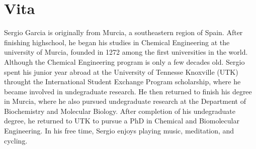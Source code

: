\chapter*{Vita} \label{ch:vita}
Sergio Garcia is originally from Murcia, a southeastern region of Spain.
After finishing highschool, he began his studies in Chemical Engineering at the university of Murcia, founded in 1272 among the first universities in the world.
Although the Chemical Engineering program is only a few decades old.
Sergio spent his junior year abroad at the University of Tennesse Knoxville (UTK) throught the International Student Exchange Program scholarship, where he became involved in undegraduate research.
He then returned to finish his degree in Murcia, where he also pursued undegraduate research at the Department of Biochemistry and Molecular Biology.
After completion of his undegraduate degree, he returned to UTK to pursue a PhD in Chemical and Biomolecular Engineering.
In his free time, Sergio enjoys playing music, meditation, and cycling.
